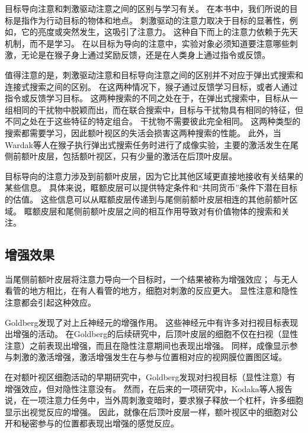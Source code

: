 目标导向注意和刺激驱动注意之间的区别与学习有关。
在本书中，我们所说的目标是指作为行动目标的物体和地点。
刺激驱动的注意力取决于目标的显著性，例如，它的亮度或突然发生，这吸引了注意力。
这种自下而上的注意力依赖于先天机制，而不是学习。
在以目标为导向的注意中，实验对象必须知道要注意哪些刺激，无论是在猴子身上通过奖励反馈，还是在人类身上通过指令或反馈。


值得注意的是，刺激驱动注意和目标导向注意之间的区别并不对应于弹出式搜索和连接式搜索之间的区别。
在这两种情况下，猴子通过反馈学习目标，或者人通过指令或反馈学习目标。
这两种搜索的不同之处在于，在弹出式搜索中，目标从一组相同的干扰物中脱颖而出，而在联合搜索中，目标与干扰物具有相同的特征，但不同之处在于这些特征的特定组合。
干扰物不需要彼此完全相同。
这两种类型的搜索都需要学习，因此额叶视区的失活会损害这两种搜索的性能\cite{wardak2004deficit}。
此外，当Wardak等人\cite{wardak2010searching}在猴子执行弹出式搜索任务时进行了成像实验，主要的激活发生在尾侧前额叶皮层，包括额叶视区，只有少量的激活在后顶叶皮层。


目标导向的注意力涉及到前额叶皮层，因为它比其他区域更直接地接收有关结果的某些信息。
具体来说，眶额皮层可以提供特定条件和“共同货币”条件下潜在目标的估值。
这些信息可以从眶额皮层传递到与尾侧前额叶皮层相连的其他前额叶区域。
眶额皮层和尾侧前额叶皮层之间的相互作用导致对有价值物体的搜索和关注。



\subsection{增强效果}

当尾侧前额叶皮层将注意力导向一个目标时，一个结果被称为增强效应；
与无人看管的地方相比，在有人看管的地方，细胞对刺激的反应更大。
显性注意和隐性注意都会引起这种效应。


Goldberg\cite{goldberg1972activity}发现了对上丘神经元的增强作用。
这些神经元中有许多对扫视目标表现出增强的活动。
在Goldberg\cite{goldberg1981behavioral}的后续研究中，后顶叶皮层的细胞不仅在扫视（显性注意）之前表现出增强，而且在隐性注意期间也表现出增强。
同样，成像显示参与刺激的激活增强\cite{corbetta2000voluntary}，激活增强发生在与参与位置相对应的视网膜位置图区域\cite{brefczynski1999physiological}。


在对额叶视区细胞活动的早期研究中，Goldberg\cite{goldberg1985cerebral}发现对扫视目标（显性注意）有增强效应，但对隐性注意没有。
然而，在后来的一项研究中，Kodaka等人\cite{kodaka1997neuronal}报告说，在一项注意力任务中，当外周刺激变暗时，要求猴子释放一个杠杆，许多细胞显示出视觉反应的增强。
因此，就像在后顶叶皮层一样，额叶视区中的细胞对公开和秘密参与的位置都表现出增强的感觉反应。


